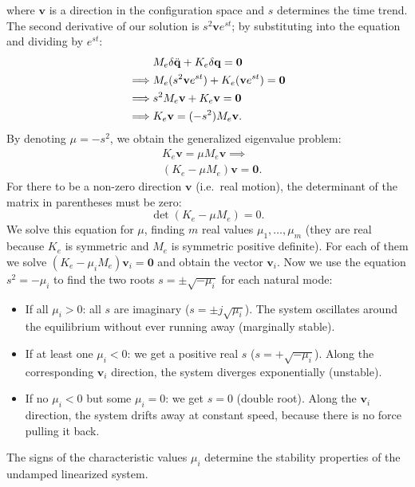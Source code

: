 \documentclass[10pt, a4paper]{report}
\newcommand{\q}{{\mathbf q}}
\begin{document}
where $\mathbf{v}$ is a direction in the configuration space and $s$ determines the time trend. The second derivative of our solution is $s^2\mathbf{v} e^{st}$; by substituting into the equation and dividing by $e^{st}$:
\begin{align}
    &M_e\delta\ddq+K_e\delta\q=\mathbf 0\\
\implies & M_e(s^2\mathbf{v} e^{st})+K_e(\mathbf{v} e^{st})=\mathbf 0\\
\implies & s^2 M_e \mathbf{v} + K_e \mathbf{v} = \mathbf{0}\\
\implies &K_e \mathbf{v} = (-s^2) M_e \mathbf{v}.
\end{align}
By denoting $\mu=-s^2$, we obtain the generalized eigenvalue problem:\begin{align}
   &K_e \mathbf{v} = \mu M_e \mathbf{v}\implies \\ 
   &(K_e - \mu M_e)\mathbf{v} = \mathbf{0}.
\end{align}
For there to be a non-zero direction $\mathbf{v}$ (i.e.\ real motion), the determinant of the matrix in parentheses must be zero:\begin{equation}
    \det(K_e - \mu M_e) = 0.
\end{equation}
We solve this equation for $\mu$, finding $m$ real values $\mu_1,\dots,\mu_m$ (they are real because $K_e$ is symmetric and $M_e$ is symmetric positive definite). For each of them we solve $(K_e - \mu_i M_e)\mathbf{v}_i = \mathbf{0}$ and obtain the vector $\mathbf{v}_i$. 
Now we use the equation $s^2 = -\mu_i$ to find the two roots $s = \pm\sqrt{-\mu_i}$ for each natural mode:
\begin{itemize}
    \item If all $\mu_i > 0$: all $s$ are imaginary ($s = \pm j\sqrt{\mu_i}$). The system oscillates around the equilibrium without ever running away (marginally stable).
    \item If at least one $\mu_i < 0$: we get a positive real $s$ ($s = +\sqrt{-\mu_i}$). Along the corresponding $\mathbf{v}_i$ direction, the system diverges exponentially (unstable).
    \item If no $\mu_i<0$ but some $\mu_i = 0$: we get $s = 0$ (double root). Along the $\mathbf{v}_i$ direction, the system drifts away at constant speed, because there is no force pulling it back.
\end{itemize}
\begin{boxproposition}{}{}
The signs of the characteristic values $\mu_i$ determine the stability properties of the undamped linearized system.
\end{boxproposition}
\end{document}
